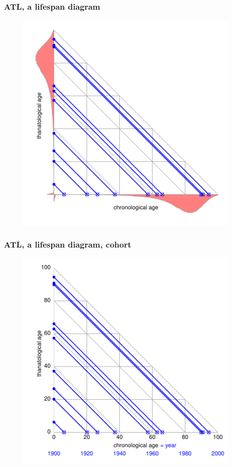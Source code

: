 \documentclass[20pt]{beamer}
\begin{document}
\begin{frame}
\frametitle{ATL, a lifespan diagram}
\begin{figure}[b]
    \centering
    \includegraphics{Figures/LabPres/ATL4.pdf}
\end{figure} 
\end{frame}

\begin{frame}
\frametitle{ATL, a lifespan diagram, cohort}
\begin{figure}[b]
    \centering
    \includegraphics{Figures/LabPres/ATL5.pdf}
\end{figure} 
\end{frame}
\end{document}
